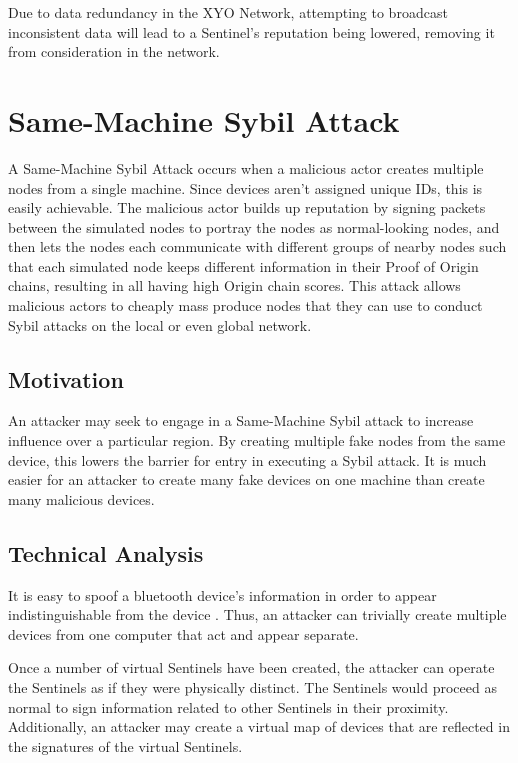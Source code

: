 \documentclass{article}
\begin{document}
Due to data redundancy in the XYO Network, attempting to broadcast inconsistent data will lead to a Sentinel's reputation being lowered, removing it from consideration in the network.

\section{Same-Machine Sybil Attack}
A Same-Machine Sybil Attack occurs when a malicious actor creates multiple nodes from a single machine. Since devices aren't assigned unique IDs, this is easily achievable. The malicious actor builds up reputation by signing packets between the simulated nodes to portray the nodes as normal-looking nodes, and then lets the nodes each communicate with different groups of nearby nodes such that each simulated node keeps different information in their Proof of Origin chains, resulting in all having high Origin chain scores. This attack allows malicious actors to cheaply mass produce nodes that they can use to conduct Sybil attacks on the local or even global network. 

\subsection{Motivation}

An attacker may seek to engage in a Same-Machine Sybil attack to increase influence over a particular region. By creating multiple fake nodes from the same device, this lowers the barrier for entry in executing a Sybil attack. It is much easier for an attacker to create many fake devices on one machine than create many malicious devices.

\subsection{Technical Analysis}

It is easy to spoof a bluetooth device's information in order to appear indistinguishable from the device \cite{bluetooth3}. Thus, an attacker can trivially create multiple devices from one computer that act and appear separate.

Once a number of virtual Sentinels have been created, the attacker can operate the Sentinels as if they were physically distinct. The Sentinels would proceed as normal to sign information related to other Sentinels in their proximity. Additionally, an attacker may create a virtual map of devices that are reflected in the signatures of the virtual Sentinels.
\end{document}
